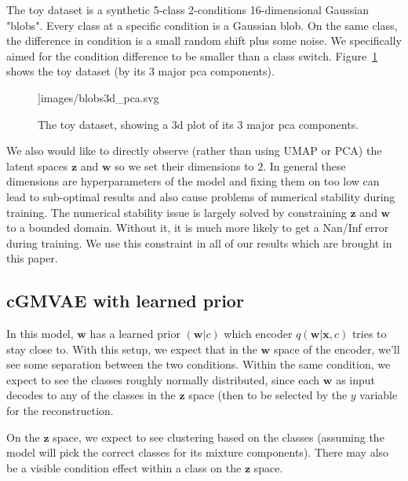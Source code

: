 \documentclass[11pt, a4paper]{report}
\theoremstyle{plain}
\theoremstyle{definition}
\theoremstyle{remark}
\newcommand{\x}{\mathbf{x}}
\newcommand{\z}{\mathbf{z}}
\newcommand{\w}{\mathbf{w}}
\begin{document}
The toy dataset is a synthetic 5-class 2-conditions 16-dimensional Gaussian "blobs".
Every class at a specific condition is a Gaussian blob. 
On the same class, the difference in condition is a small random shift plus some
noise. We specifically aimed for the condition difference to be smaller than a
class switch.
Figure~\ref{fig:blobs_3d} shows the toy dataset (by its 3 major pca components).

\begin{figure}[h]
\centering
\textwidth]{images/blobs3d_pca.svg}
\caption{The toy dataset, showing a 3d plot of its 3 major pca components.
}
\label{fig:blobs_3d}
\end{figure}

We also would like to directly observe (rather than using UMAP or PCA) the
latent spaces $\z$ and $\w$ so we set their dimensions to $2$.
In general these dimensions are hyperparameters of the model and fixing them on 
too low can lead to sub-optimal results and also cause problems of numerical
stability during training.
The numerical stability issue is largely solved by constraining $\z$ and $\w$ to
a bounded domain. Without it, 
it is much more likely to get a Nan/Inf error during training.
We use this constraint in all of our results which are brought
in this paper.

\subsection{cGMVAE with learned prior}

In this model, $\w$ has a learned prior $(\w | c)$ which encoder $q(\w | \x, c)$ 
tries to stay close to.
With this setup, we expect that in the $\w$ space of the 
encoder, we'll see some separation between the two conditions.
Within the same condition, we expect to see the classes roughly normally
distributed, since each $\w$ as input decodes to any of the classes in the $\z$
space (then to be selected by the $y$ variable for the reconstruction.

On the $\z$ space, we expect to see clustering based on the classes (assuming
the model will pick the correct classes for its mixture components).
There may also be a visible condition effect within a class on the $\z$ space.
\end{document}
